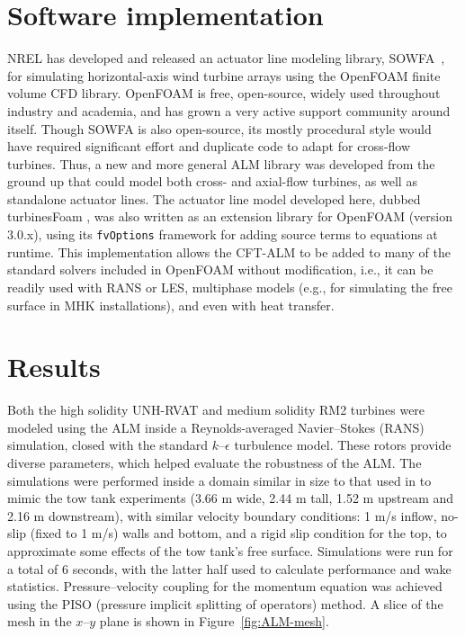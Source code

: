 \documentclass[times]{weauth}
\begin{document}
\section{Software implementation}

NREL has developed and released an actuator line modeling library,
SOWFA~\cite{Churchfield2014b}, for simulating horizontal-axis wind turbine
arrays using the OpenFOAM finite volume CFD library. OpenFOAM is free,
open-source, widely used throughout industry and academia, and has grown a very
active support community around itself. Though SOWFA is also open-source, its
mostly procedural style would have required significant effort and duplicate
code to adapt for cross-flow turbines. Thus, a new and more general ALM library
was developed from the ground up that could model both cross- and axial-flow
turbines, as well as standalone actuator lines. The actuator line model
developed here, dubbed turbinesFoam \cite{Bachant2016-turbinesFoam-v0.0.7}, was
also written as an extension library for OpenFOAM (version 3.0.x), using its
\texttt{fvOptions} framework for adding source terms to equations at runtime.
This implementation allows the CFT-ALM to be added to many of the standard
solvers included in OpenFOAM without modification, i.e., it can be readily used
with RANS or LES, multiphase models (e.g., for simulating the free surface in
MHK installations), and even with heat transfer.


\section{Results}

Both the high solidity UNH-RVAT and medium solidity RM2 turbines were modeled
using the ALM inside a Reynolds-averaged Navier--Stokes (RANS) simulation,
closed with the standard $k$--$\epsilon$ turbulence model. These rotors provide
diverse parameters, which helped evaluate the robustness of the ALM. The
simulations were performed inside a domain similar in size to that used in
\cite{Bachant2016-BR-CFD} to mimic the tow tank experiments (3.66 m wide, 2.44 m
tall, 1.52 m upstream and 2.16 m downstream), with similar velocity boundary
conditions: 1 m/s inflow, no-slip (fixed to 1 m/s) walls and bottom, and a rigid
slip condition for the top, to approximate some effects of the tow tank's free
surface. Simulations were run for a total of 6 seconds, with the latter half
used to calculate performance and wake statistics. Pressure--velocity coupling
for the momentum equation was achieved using the PISO (pressure implicit
splitting of operators) method. A slice of the mesh in the $x$--$y$ plane is
shown in Figure~\ref{fig:ALM-mesh}.
\end{document}
